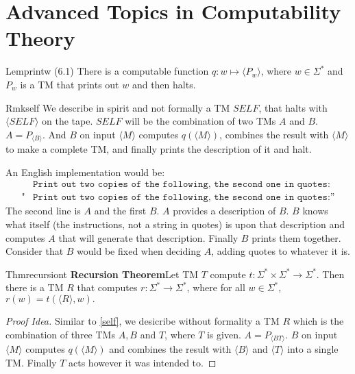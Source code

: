 \chapter{Advanced Topics in Computability Theory}

\begin{reference}{Lem}{printw}
  (6.1) There is a computable function $q:w\mapsto\langle P_w\rangle$, where $w\in \Sigma^*$ and $P_w$ is a TM that prints out $w$ and then halts.
\end{reference}

\begin{reference}{Rmk}{self}
  We describe in spirit and not formally a TM $SELF$, that halts with $\langle SELF\rangle$ on the tape. $SELF$ will be the combination of two TMs $A$ and $B$. $A=P_{\langle B\rangle}$. And $B$ on input $\langle M\rangle$ computes $q(\langle M\rangle)$, combines the result with $\langle M\rangle$ to make a complete TM, and finally prints the description of it and halt.
\end{reference}

An English implementation would be:
\begin{align*}
             & \texttt{Print out two copies of the following, the second one in quotes:}  \\
  \texttt{"} & \texttt{Print out two copies of the following, the second one in quotes:”}
\end{align*}
The second line is $A$ and the first $B$. $A$ provides a description of $B$. $B$ knows what itself (the instructions, not a string in quotes) is upon that description and computes $A$ that will generate that description. Finally $B$ prints them together. Consider that $B$ would be fixed when deciding $A$, adding quotes to whatever it is.

\begin{reference}{Thm}{recursiont}
  \textbf{Recursion Theorem}\quad Let TM $T$ compute $t:\Sigma^*\times \Sigma^*\to \Sigma^*$. Then there is a TM $R$ that computes $r:\Sigma^*\to \Sigma^*$, where for all $w\in \Sigma^*$, $r(w)=t(\langle R\rangle, w).$
\end{reference}

\begin{proof}[Proof Idea]
  Similar to \ref{self}, we desicribe without formality a TM $R$ which is the combination of three TMs $A,B$ and $T$, where $T$ is given. $A=P_{\langle BT\rangle}$. $B$ on input $\langle M\rangle$ computes $q(\langle M\rangle)$ and combines the result with $\langle B\rangle$ and $\langle T\rangle$ into a single TM. Finally $T$ acts however it was intended to.
\end{proof}

